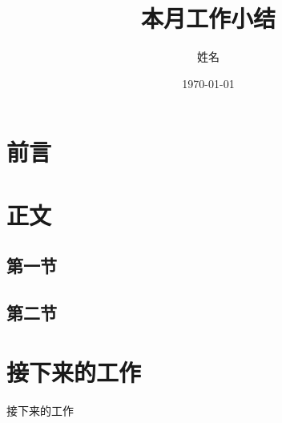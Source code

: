 \documentclass{./banyuan-ppt}
\title{本月工作小结}
\author{姓名}
\institute{学校}
\date{\today}
\begin{document}
\createtitle
\createoutline

\section{前言}

\section{正文}
\subsection{第一节}
\subsection{第二节}

\section{接下来的工作}
\begin{frame}{接下来的工作}
\end{frame}

\createlastpage
\end{document}
